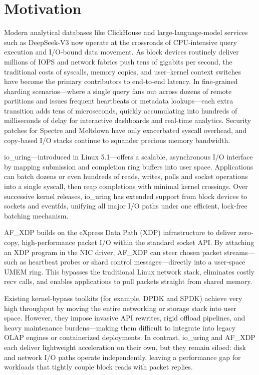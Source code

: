 \documentclass[sigconf,10pt]{acmart}
\begin{document}
\section{Motivation}\label{sec:motivation}
Modern analytical databases like ClickHouse and large‐language‐model services such as DeepSeek-V3 now operate at the crossroads of CPU‐intensive query execution and I/O‐bound data movement. As block devices routinely deliver millions of IOPS and network fabrics push tens of gigabits per second, the traditional costs of syscalls, memory copies, and user–kernel context switches have become the primary contributors to end‐to‐end latency. In fine‐grained sharding scenarios—where a single query fans out across dozens of remote partitions and issues frequent heartbeats or metadata lookups—each extra transition adds tens of microseconds, quickly accumulating into hundreds of milliseconds of delay for interactive dashboards and real‐time analytics. Security patches for Spectre and Meltdown have only exacerbated syscall overhead, and copy‐based I/O stacks continue to squander precious memory bandwidth.

io\_uring—introduced in Linux 5.1—offers a scalable, asynchronous I/O interface by mapping submission and completion ring buffers into user space. Applications can batch dozens or even hundreds of reads, writes, polls and socket operations into a single syscall, then reap completions with minimal kernel crossings. Over successive kernel releases, io\_uring has extended support from block devices to sockets and eventfds, unifying all major I/O paths under one efficient, lock‐free batching mechanism.

AF\_XDP\cite{du2024understanding} builds on the eXpress Data Path (XDP) infrastructure to deliver zero‐copy, high‐performance packet I/O within the standard socket API. By attaching an XDP program in the NIC driver, AF\_XDP can steer chosen packet streams—such as heartbeat probes or shard control messages—directly into a user‐space UMEM ring. This bypasses the traditional Linux network stack, eliminates costly recv calls, and enables applications to pull packets straight from shared memory.

Existing kernel‐bypass toolkits (for example, DPDK and SPDK) achieve very high throughput by moving the entire networking or storage stack into user space. However, they impose invasive API rewrites, rigid offload pipelines, and heavy maintenance burdens—making them difficult to integrate into legacy OLAP engines or containerized deployments. In contrast, io\_uring and AF\_XDP each deliver lightweight acceleration on their own, but they remain siloed: disk and network I/O paths operate independently, leaving a performance gap for workloads that tightly couple block reads with packet replies.
\end{document}
